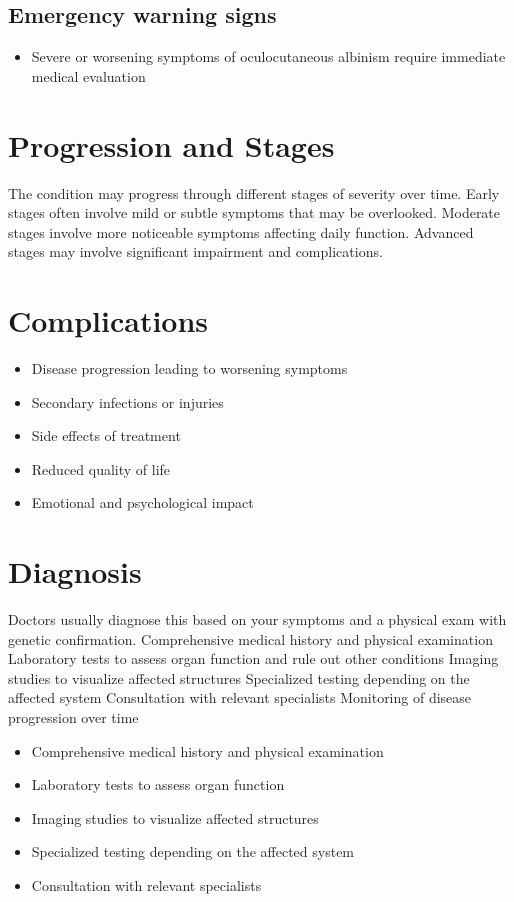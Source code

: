 \subsection{Emergency warning signs}
\begin{itemize}[noitemsep]
  \item Severe or worsening symptoms of oculocutaneous albinism require immediate medical evaluation
\end{itemize}
\section{Progression and Stages}
The condition may progress through different stages of severity over time. Early stages often involve mild or subtle symptoms that may be overlooked. Moderate stages involve more noticeable symptoms affecting daily function. Advanced stages may involve significant impairment and complications.
\section{Complications}
\begin{itemize}[noitemsep]
  \item Disease progression leading to worsening symptoms
  \item Secondary infections or injuries
  \item Side effects of treatment
  \item Reduced quality of life
  \item Emotional and psychological impact
\end{itemize}
\section{Diagnosis}
Doctors usually diagnose this based on your symptoms and a physical exam with genetic confirmation. Comprehensive medical history and physical examination Laboratory tests to assess organ function and rule out other conditions Imaging studies to visualize affected structures Specialized testing depending on the affected system Consultation with relevant specialists Monitoring of disease progression over time

\begin{itemize}[noitemsep]
  \item Comprehensive medical history and physical examination
  \item Laboratory tests to assess organ function
  \item Imaging studies to visualize affected structures
  \item Specialized testing depending on the affected system
  \item Consultation with relevant specialists
\end{itemize}
